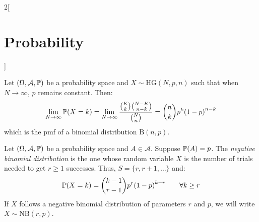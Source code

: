 \documentclass[../../../main.tex]{subfiles}
\begin{document}
\begin{multicols}{2}[\section{Probability}]
\begin{definition}
  \end{definition}
  \begin{theorem}
    Let $(\Omega,\mathcal{A},\mathbb{P})$ be a probability space and $X\sim \text{HG}(N,p,n)$ such that when $N\to\infty$, $p$ remains constant. Then:
    $$\lim_{N\to\infty}\mathbb{P}(X=k)=\lim_{N\to\infty}\frac{\binom{K}{k}\binom{N-K}{n-k}}{\binom{N}{n}}=\binom{n}{k}p^k{(1-p)}^{n-k}$$ which is the pmf of a binomial distribution $\text{B}(n,p)$.
  \end{theorem}
  \begin{definition}
    Let $(\Omega,\mathcal{A},\mathbb{P})$ be a probability space and $A\in\mathcal{A}$. Suppose $\mathbb{P}(A)=p$. The \textit{negative binomial distribution} is the one whose random variable $X$ is the number of trials needed to get $r\geq 1$ successes. Thus, $S=\{r,r+1,\ldots\}$ and: $$\mathbb{P}(X=k)=\binom{k-1}{r-1}p^r{(1-p)}^{k-r}\qquad \forall k\geq r$$ If $X$ follows a negative binomial distribution of parameters $r$ and $p$, we will write $X\sim \text{NB}(r,p)$.
  \end{definition}

\end{multicols}
\end{document}
